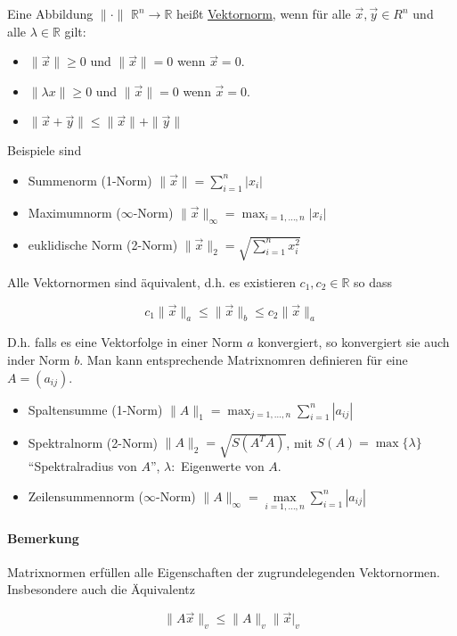 \documentclass[a4paper,ngerman]{scrbook}
\newcommand{\R}{\ensuremath{\mathbb{R}}}%
\begin{document}
Eine Abbildung  $\| \cdot \|$ $\R^n \to \R$ heißt \underline{Vektornorm}, wenn für alle $\vec{x}, \vec{y} \in R^n$ und alle $\lambda \in \R$ gilt:
\begin{itemize}
\item $\|\vec{x}\| \geq 0$ und $\|\vec{x}\| = 0$ wenn $\vec{x} = 0$.
\item $\|\lambda x\| \geq 0$ und $\|\vec{x}\| = 0$ wenn $\vec{x} = 0$.
\item $\|\vec{x} + \vec{y}\| \leq \|\vec{x}\| + \|\vec{y}\|$
\end{itemize}

Beispiele sind

\begin{itemize}
\item Summenorm (1-Norm) $\|\vec{x}\| = \sum_{i=1}^n |x_i|$
  \item Maximumnorm ($\infty$-Norm) $\|\vec{x}\|_{\infty} = \max_{i=1,\dots,n} |x_i|$
\item euklidische Norm (2-Norm) $\|\vec{x}\|_2 = \sqrt{\sum_{i=1}^n x_i^2}$
\end{itemize}

Alle Vektornormen sind äquivalent, d.h\@. es existieren $c_1,c_2 \in \R$ so dass

\[
c_1\|\vec{x}\|_a \leq \|\vec{x}\|_b \leq c_2 \|\vec{x}\|_a
\]

D.h\@. falls es eine Vektorfolge in einer Norm $a$ konvergiert, so konvergiert sie auch inder Norm $b$. Man kann entsprechende Matrixnomren definieren für eine $A = (a_{ij})$.
\begin{itemize}
\item Spaltensumme (1-Norm) $\|A\|_1 = \max_{j=1,\dots,n} \sum_{i=1}^n |a_{ij}|$
\item Spektralnorm (2-Norm) $\|A\|_2 = \sqrt{S(A^TA)}$, mit $S(A) = \max\{\lambda\}$ "`Spektralradius von $A$"', $\lambda\colon$ Eigenwerte von $A$.
\item Zeilensummennorm ($\infty$-Norm) $\|A\|_\infty = \max\limits_{i=1,\dots,n} \sum_{i=1}^n |a_{ij}|$
\end{itemize}

\paragraph{Bemerkung}

Matrixnormen erfüllen alle Eigenschaften der zugrundelegenden Vektornormen. Insbesondere auch die Äquivalentz

\[
\|A\vec{x}\|_v \leq \|A\|_v\|\vec{x}|_v
\]
\end{document}
